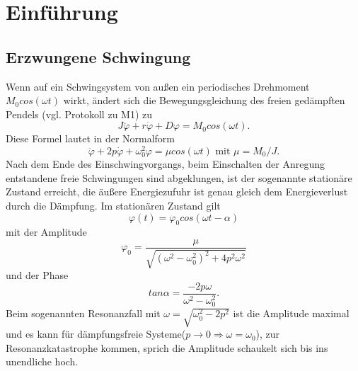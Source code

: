 \section{Einführung}
\subsection{Erzwungene Schwingung}
Wenn auf ein Schwingsystem von außen ein periodisches Drehmoment $M_0cos(\omega t)$ wirkt, ändert sich die Bewegungsgleichung des freien gedämpften Pendels (vgl. Protokoll zu M1) zu
\begin{equation}
J\ddot{\varphi}+r\dot{\varphi}+D\varphi=M_0cos(\omega t).
\end{equation}
Diese Formel lautet in der Normalform
\begin{equation}
\ddot{\varphi}+2p\dot{\varphi}+\omega_0^2\varphi= \mu cos(\omega t) \text{   mit   } \mu=M_0/J.
\end{equation}
Nach dem Ende des Einschwingvorgangs, beim Einschalten der Anregung entstandene freie Schwingungen sind abgeklungen, ist der sogenannte stationäre Zustand erreicht, die äußere Energiezufuhr ist genau gleich dem Energieverlust durch die Dämpfung. Im stationären Zustand gilt
\begin{equation}
\varphi (t)= \varphi_0cos(\omega t-\alpha)
\end{equation}
mit der Amplitude
\begin{equation}
\varphi_0=\frac{\mu}{\sqrt{(\omega^2-\omega_0^2)^2+4p^2\omega^2}}
\label{eq:amplitude}
\end{equation}
und der Phase
\begin{equation}
tan \alpha = \frac{-2p\omega}{\omega^2-\omega_0^2}.
\label{eq:phase}
\end{equation}
Beim sogenannten Resonanzfall mit $\omega=\sqrt{\omega_0^2-2p^2}$ ist die Amplitude maximal und es kann für dämpfungsfreie Systeme($p\rightarrow 0 \Rightarrow \omega = \omega_0$), zur Resonanzkatastrophe kommen, sprich die Amplitude schaukelt sich bis ins unendliche hoch.
